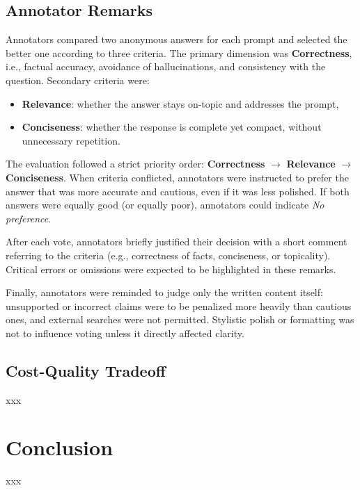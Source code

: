 \documentclass[manuscript,screen]{acmart}
\begin{document}
\begin{CCSXML}
	
	\subsection{Annotator Remarks}
	\label{subsec:annotator-remarks}
	
	Annotators compared two anonymous answers for each prompt and selected the
	better one according to three criteria. The primary dimension was
	\textbf{Correctness}, i.e., factual accuracy, avoidance of hallucinations, and
	consistency with the question. Secondary criteria were:
	
	\begin{itemize}
	  \item \textbf{Relevance}: whether the answer stays on-topic and addresses the prompt,
	  \item \textbf{Conciseness}: whether the response is complete yet compact, without unnecessary repetition.
	\end{itemize}
	
	The evaluation followed a strict priority order:
	\textbf{Correctness} $\rightarrow$ \textbf{Relevance} $\rightarrow$
	\textbf{Conciseness}. When criteria conflicted, annotators were instructed to
	prefer the answer that was more accurate and cautious, even if it was less
	polished. If both answers were equally good (or equally poor), annotators could
	indicate \emph{No preference}.
	
	After each vote, annotators briefly justified their decision with a short
	comment referring to the criteria (e.g., correctness of facts, conciseness, or
	topicality). Critical errors or omissions were expected to be highlighted in
	these remarks.
	
	Finally, annotators were reminded to judge only the written content itself:
	unsupported or incorrect claims were to be penalized more heavily than cautious
	ones, and external searches were not permitted. Stylistic polish or formatting
	was not to influence voting unless it directly affected clarity.

	
	\subsection{Cost-Quality Tradeoff}
	\label{subsec:cost-quality-tradeoff}
	xxx
	
\section {Conclusion}
xxx



\end{CCSXML}
\end{document}

